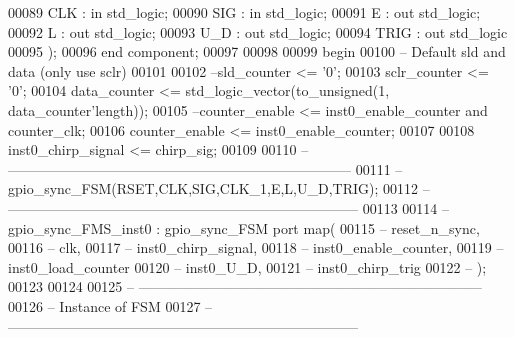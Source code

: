 \begin{DoxyCode}
00089         CLK     : \textcolor{keywordflow}{in} \textcolor{comment}{std\_logic};
00090         SIG     : \textcolor{keywordflow}{in} \textcolor{comment}{std\_logic};
00091         E           : \textcolor{keywordflow}{out} \textcolor{comment}{std\_logic};
00092         L           : \textcolor{keywordflow}{out} \textcolor{comment}{std\_logic};
00093         U\_D     : \textcolor{keywordflow}{out} \textcolor{comment}{std\_logic};
00094         TRIG        : \textcolor{keywordflow}{out} \textcolor{comment}{std\_logic}     
00095         );
00096 \textcolor{keywordflow}{end} \textcolor{keywordflow}{component};
00097 
00098 
00099 \textcolor{vhdlkeyword}{begin}
00100 \textcolor{keyword}{-- Default sld and data (only use sclr)}
00101 
00102 \textcolor{keyword}{--sld\_counter <= '0';}
00103 \textcolor{vhdlchar}{sclr_counter} \textcolor{vhdlchar}{<=} \textcolor{vhdlchar}{'}\textcolor{vhdllogic}{}\textcolor{vhdllogic}{0}\textcolor{vhdlchar}{'};
00104 \textcolor{vhdlchar}{data_counter} \textcolor{vhdlchar}{<=} \textcolor{comment}{std\_logic\_vector}\textcolor{vhdlchar}{(}\textcolor{vhdlchar}{to\_unsigned}\textcolor{vhdlchar}{(}\textcolor{vhdllogic}{}\textcolor{vhdllogic}{1}\textcolor{vhdlchar}{,} \textcolor{vhdlchar}{data_counter}\textcolor{vhdlchar}{'}\textcolor{vhdlkeyword}{length}\textcolor{vhdlchar}{)}\textcolor{vhdlchar}{)};
00105 \textcolor{keyword}{--counter\_enable <= inst0\_enable\_counter and counter\_clk;}
00106 \textcolor{vhdlchar}{counter_enable} \textcolor{vhdlchar}{<=} \textcolor{vhdlchar}{inst0_enable_counter};
00107 
00108 inst0\_chirp\_signal <= chirp\_sig;
00109 
00110 \textcolor{keyword}{ -- --------------------------------------------------------------------------        }
00111 \textcolor{keyword}{-- gpio\_sync\_FSM(RSET,CLK,SIG,CLK\_1,E,L,U\_D,TRIG);}
00112 \textcolor{keyword}{-- ---------------------------------------------------------------------------}
00113 
00114 \textcolor{keyword}{--gpio\_sync\_FMS\_inst0 : gpio\_sync\_FSM port map(}
00115 \textcolor{keyword}{--      reset\_n\_sync,}
00116 \textcolor{keyword}{--      clk,}
00117 \textcolor{keyword}{--      inst0\_chirp\_signal,}
00118 \textcolor{keyword}{--      inst0\_enable\_counter,}
00119 \textcolor{keyword}{--      inst0\_load\_counter}
00120 \textcolor{keyword}{--      inst0\_U\_D,}
00121 \textcolor{keyword}{--      inst0\_chirp\_trig}
00122 \textcolor{keyword}{--      );}
00123 
00124 
00125 \textcolor{keyword}{ -- --------------------------------------------------------------------------        }
00126 \textcolor{keyword}{-- Instance of FSM }
00127 \textcolor{keyword}{-- ---------------------------------------------------------------------------}

\end{DoxyCode}
